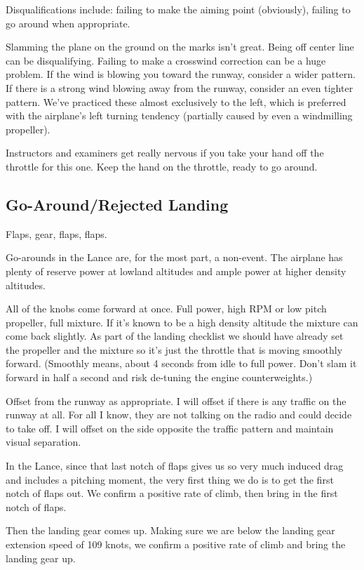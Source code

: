 Disqualifications include: failing to make the aiming point (obviously), failing to go around when appropriate.

Slamming the plane on the ground on the marks isn't great. Being off center line can be disqualifying. Failing to make a crosswind correction can be a huge problem. If the wind is blowing you toward the runway, consider a wider pattern. If there is a strong wind blowing away from the runway, consider an even tighter pattern. We've practiced these almost exclusively to the left, which is preferred with the airplane's left turning tendency (partially caused by even a windmilling propeller).

Instructors and examiners get really nervous if you take your hand off the throttle for this one. Keep the hand on the throttle, ready to go around.

\subsection{Go-Around/Rejected Landing}

Flaps, gear, flaps, flaps.

Go-arounds in the Lance are, for the most part, a non-event. The airplane has plenty of reserve power at lowland altitudes and ample power at higher density altitudes.

All of the knobs come forward at once. Full power, high RPM or low pitch propeller, full mixture. If it's known to be a high density altitude the mixture can come back slightly. As part of the landing checklist we should have already set the propeller and the mixture so it's just the throttle that is moving smoothly forward. (Smoothly means, about 4 seconds from idle to full power. Don't slam it forward in half a second and risk de-tuning the engine counterweights.)

Offset from the runway as appropriate. I will offset if there is any traffic on the runway at all. For all I know, they are not talking on the radio and could decide to take off. I will offset on the side opposite the traffic pattern and maintain visual separation.

In the Lance, since that last notch of flaps gives us so very much induced drag and includes a pitching moment, the very first thing we do is to get the first notch of flaps out. We confirm a positive rate of climb, then bring in the first notch of flaps.

Then the landing gear comes up. Making sure we are below the landing gear extension speed of 109 knots, we confirm a positive rate of climb and bring the landing gear up.

